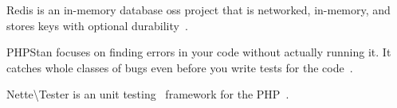  \label{sec:theory:redis}

Redis is an in-memory database \gls{oss} project that is networked, in-memory, and stores keys with optional durability~\cite{wiki:redis}.

 \label{sec:theory:phpstan}

PHPStan focuses on finding errors in your code without actually running it. It catches whole classes of bugs even before you write tests for the code~\cite{github:phpstan}.

 \label{sec:theory:nette-tester}

Nette\textbackslash{}Tester is an unit testing~\cite{wiki:unit-testing} framework for the PHP~\cite{tester:docs}.
